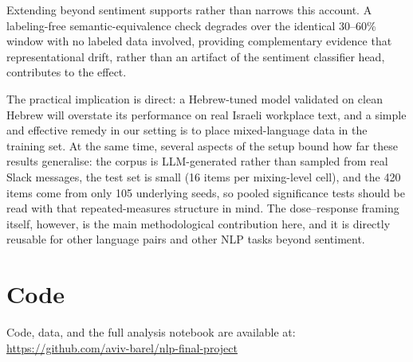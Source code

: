 \documentclass{article}
\begin{document}
Extending beyond sentiment supports rather than narrows this account. A
labeling-free semantic-equivalence check degrades over the identical
30--60\% window with no labeled data involved, providing complementary
evidence that representational drift, rather than an artifact of the
sentiment classifier head, contributes to the effect.

The practical implication is direct: a Hebrew-tuned model validated on clean
Hebrew will overstate its performance on real Israeli workplace text, and a
simple and effective remedy in our setting is to place mixed-language data in
the training set. At the same time, several aspects of the setup bound how
far these results generalise: the corpus is LLM-generated rather than sampled
from real Slack messages, the test set is small (16 items per mixing-level
cell), and the 420 items come from only 105 underlying seeds, so pooled
significance tests should be read with that repeated-measures structure in
mind. The dose--response framing itself, however, is the main methodological
contribution here, and it is directly reusable for other language pairs and
other NLP tasks beyond sentiment.

\section{Code}

Code, data, and the full analysis notebook are available at:
\url{https://github.com/aviv-barel/nlp-final-project}



\end{document}
